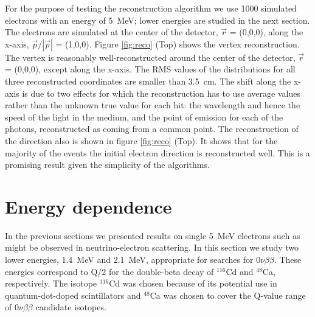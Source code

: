 \documentclass[cits]{JINST}
\begin{document}
For the purpose of testing the reconstruction algorithm we use 1000
simulated electrons with an energy of 5~MeV; lower energies are studied in the next section.
The electrons are simulated at the center of the detector, $\vec{r}$ = (0,0,0), along
the x-axis, $\vec{p}/|\vec{p}|$ = (1,0,0). Figure \ref{fig:reco} (Top)
shows the vertex reconstruction. The vertex is reasonably well-reconstructed around the center of the detector, $\vec{r}$ = (0,0,0),
except along the x-axis. The RMS values of the distributions for all three
reconstructed coordinates are smaller than 3.5~cm. The shift along
the x-axis is due to two effects for which the reconstruction has to
use average values rather than the unknown true value for each
hit: the wavelength and hence the speed of the light in the medium,
and the point of emission for each of the photons, reconstructed
as coming from a common point. The reconstruction of the direction
also is shown in figure \ref{fig:reco} (Top). It shows that for the majority
of the events the initial electron direction is reconstructed well.
This is a promising result given the simplicity of the algorithms.

\section{Energy dependence}
\label{edep_section}
In the previous sections we presented results on single 5~MeV electrons such as might be observed in neutrino-electron scattering.
In this section we study two lower energies, 1.4~MeV and 2.1~MeV, appropriate for searches for $0\nu\beta\beta$. These
energies correspond to Q/2 for the double-beta decay of
$^{116}$Cd and $^{48}$Ca, respectively\cite{cd1,biller}. The isotope
$^{116}$Cd was chosen because of its potential use in quantum-dot-doped
scintillators\cite{qdot,qdot2} and $^{48}$Ca was chosen
to cover the Q-value range of $0\nu\beta\beta$ candidate isotopes.
\end{document}
